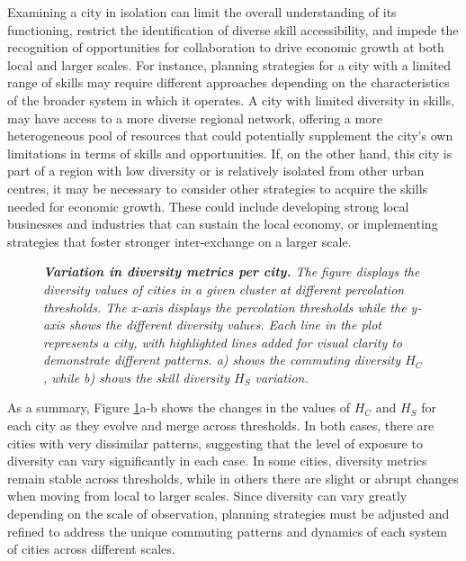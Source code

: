 \documentclass[11pt, a4paper]{article}
\begin{document}
Examining a city in isolation can limit the overall understanding of its functioning, restrict the identification of diverse skill accessibility, and impede the recognition of opportunities for collaboration to drive economic growth at both local and larger scales.  For instance, planning strategies for a city with a limited range of skills may require different approaches depending on the characteristics of the broader system in which it operates. A city with limited diversity in skills, may have access to a more diverse regional network, offering  a more heterogeneous pool of resources that could potentially supplement the city's own limitations in terms of skills and opportunities. If, on the other hand, this city is part of a region with low diversity or is relatively isolated from other urban centres, it may be necessary to consider other strategies to acquire the skills needed for economic growth. These could include developing strong local businesses and industries that can sustain the local economy, or implementing strategies that foster stronger inter-exchange on a larger scale.

\begin{figure}[h!]
\centering
{}
\caption{\textit{\textbf{Variation in diversity metrics per city.} The figure displays the diversity values of cities in a given cluster at different percolation thresholds. The x-axis displays the percolation thresholds while the y-axis shows the different diversity values. Each line in the plot represents a city, with highlighted lines added for visual clarity to demonstrate different patterns. a) shows the commuting diversity $H_{C}$, while b) shows the skill diversity $H_{S}$ variation.  }}
\label{lines}
\end{figure}
 
As a summary, Figure \ref{lines}a-b shows the changes in the values of $H_{C}$ and $H_{S}$ for each city as they evolve and merge across thresholds. In both cases, there are cities with very dissimilar patterns, suggesting that the level of exposure to diversity can vary significantly in each case. In some cities, diversity metrics remain stable across thresholds, while in others there are slight or abrupt changes when moving from local to larger scales. Since diversity can vary greatly depending on the scale of observation, planning strategies must be adjusted and refined to address the unique commuting patterns and dynamics of each system of cities across different scales. 
\end{document}
